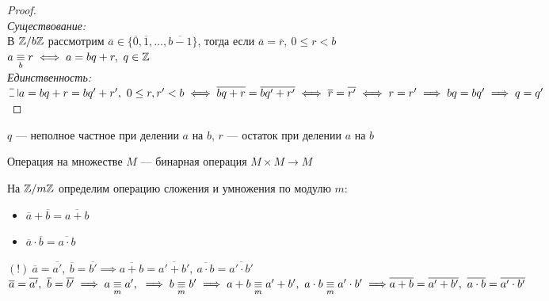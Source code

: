 \begin{normalsize}
\begin{proof}\\
    \textsl{Существование:}\\
    В $\mathbb{Z}/b\mathbb{Z}$ рассмотрим $\overline{a} \in \{\overline{0}, \overline{1}, \ldots, \overline{b-1}\}$, тогда если $\overline{a} = \overline{r},~0 \leq r < b$\\
    $a \underset{b}{\equiv} r \iff a = bq + r,~q \in \mathbb{Z}$\\
    \textsl{Единственность:}\\
    $\letus a = bq + r = bq' + r',~0 \leq r, r' < b \iff \overline{bq+r} = \overline{bq'+r'} \iff \overline{r} = \overline{r'} \iff r = r' \implies bq = bq' \implies q = q'$\\
\end{proof}

\begin{defn}
    $q$ --- неполное частное при делении $a$ на $b$, $r$ --- остаток при делении $a$ на $b$
\end{defn}

\begin{defn}
    Операция на множестве $M$ --- бинарная операция $M \times M \to M$
\end{defn}

На $\mathbb{Z}/m\mathbb{Z}$ определим операцию сложения и умножения по модулю $m$:\\
\begin{itemize}
    \item $\overline{a} + \overline{b} = \overline{a + b}$
    \item $\overline{a} \cdot \overline{b} = \overline{a \cdot b}$
\end{itemize}

$(!)~\overline{a} = \overline{a'},~\overline{b} = \overline{b'} \implies \overline{a + b} = \overline{a' + b'},~\overline{a \cdot b} = \overline{a' \cdot b'}$\\
$\overline{a} = \overline{a'},~\overline{b} = \overline{b'} \implies a \underset{m}{\equiv} a',~\implies b \underset{m}{\equiv} b' \implies a + b \underset{m}{\equiv} a' + b',~ a \cdot b \underset{m}{\equiv} a' \cdot b' \implies\\ 
\overline{a + b} = \overline{a' + b'},~\overline{a \cdot b} = \overline{a' \cdot b'}$\\


\end{normalsize}
